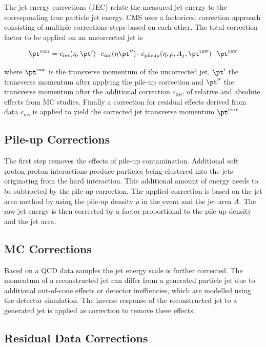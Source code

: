 The jet energy corrections (JEC) relate the measured jet energy to the
corresponding true particle jet energy. CMS uses a factoriced correction approach
consisting of multiple corrections steps based on each other. The total
correction factor to be applied on an uncorrected jet is

\begin{equation}
    \pt^{\mathrm{corr}} = c_{\mathrm{res}} (\eta, \pt') \cdot c_{\mathrm{mc}}
    (\eta \pt'') \cdot c_{\mathrm{pileup}}(\eta, \rho, A_j, \pt^{\mathrm{raw}}) \cdot \pt^{\mathrm{raw}} 
\end{equation}

where $\pt^{\mathrm{raw}}$ is the transverse momentum of the uncorrected jet,
$\pt'$ the transverse momentum after applying the pile-up correction and $\pt''$
the transverse momentum after the additional correction $c_\mathrm{MC}$ of
relative and absolute effects from MC studies. Finally a correction for residual
effects derived from data $c_{\mathrm{res}}$ is applied to yield the corrected
jet transverse momentum $\pt^{\mathrm{corr}}$.

\subsection{Pile-up Corrections}

The first step removes the effects of pile-up contamination. Additional soft proton-proton
interactions produce particles being clustered into the jets originating from
the hard interaction. This additional amount of energy needs to be subtracted by
the pile-up correction. The applied correction is based on the jet area method
by using the pile-up density $\rho$ in the event and the jet area $A$. The raw
jet energy is then corrected by a factor proportional to the pile-up density and
the jet area.

\subsection{MC Corrections}

Based on a QCD data samples the jet energy scale is further corrected. The
momentum of a reconstructed jet can differ from a generated particle jet due to
additional out-of-cone effects or detector ineffiencies, which are modelled
using the detector simulation. The inverse response of the reconstructed jet to
a generated jet is applied as correction to remove these effects.

\subsection{Residual Data Corrections}

